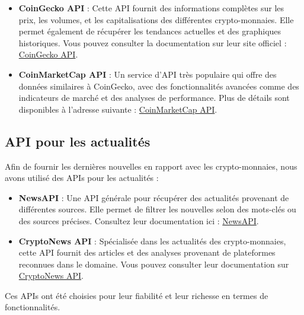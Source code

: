 \documentclass[a4paper,11pt]{article}
\begin{document}
\begin{itemize}
    \item \textbf{CoinGecko API} : Cette API fournit des informations complètes sur les prix, les volumes, et les capitalisations des différentes crypto-monnaies. Elle permet également de récupérer les tendances actuelles et des graphiques historiques. Vous pouvez consulter la documentation sur leur site officiel : \href{https://www.coingecko.com/en/api}{CoinGecko API}.\\

    \item \textbf{CoinMarketCap API} : Un service d'API très populaire qui offre des données similaires à CoinGecko, avec des fonctionnalités avancées comme des indicateurs de marché et des analyses de performance. Plus de détails sont disponibles à l'adresse suivante : \href{https://coinmarketcap.com/api/}{CoinMarketCap API}.\\
\end{itemize}

\subsection{API pour les actualités}
Afin de fournir les dernières nouvelles en rapport avec les crypto-monnaies, nous avons utilisé des APIs pour les actualités :

\begin{itemize}\\
    \item \textbf{NewsAPI} : Une API générale pour récupérer des actualités provenant de différentes sources. Elle permet de filtrer les nouvelles selon des mots-clés ou des sources précises. Consultez leur documentation ici : \href{https://newsapi.org/}{NewsAPI}.\\

    \item \textbf{CryptoNews API} : Spécialisée dans les actualités des crypto-monnaies, cette API fournit des articles et des analyses provenant de plateformes reconnues dans le domaine. Vous pouvez consulter leur documentation sur \href{https://cryptonews-api.com/}{CryptoNews API}.\\
\end{itemize}

Ces APIs ont été choisies pour leur fiabilité et leur richesse en termes de fonctionnalités.
\end{document}
